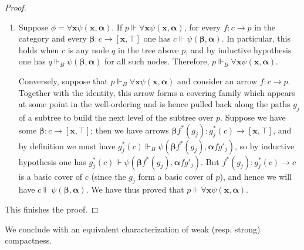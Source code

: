 \documentclass[a4paper,11pt]{article}
\theoremstyle{plain}
\theoremstyle{plain}
\theoremstyle{remark}
\begin{document}
\begin{proof}
\begin{enumerate}
  \item Suppose $\phi=\forall \mathbf{x} \psi(\mathbf{x}, \boldsymbol{\alpha})$. If $p \Vdash \forall \mathbf{x} \psi(\mathbf{x}, \boldsymbol{\alpha})$, for every $f: c \to p$ in the category and every $\boldsymbol{\beta}: c \to [\mathbf{x}, \top]$ one has $c \Vdash \psi(\boldsymbol{\beta}, \boldsymbol{\alpha})$. In particular, this holds when $c$ is any node $q$ in the tree above $p$, and by inductive hypothesis one has $q \Vdash_B \psi(\boldsymbol{\beta}, \boldsymbol{\alpha})$ for all such nodes. Therefore, $p \Vdash_B \forall \mathbf{x} \psi(\mathbf{x}, \boldsymbol{\alpha})$.
  
  Conversely, suppose that $p \Vdash_B \forall \mathbf{x} \psi(\mathbf{x}, \boldsymbol{\alpha})$ and consider an arrow $f: c \to p$. Together with the identity, this arrow forms a covering family which appears at some point in the well-ordering and is hence pulled back along the paths $g_j$ of a subtree to build the next level of the subtree over $p$. Suppose we have some $\boldsymbol{\beta}: c \to [\mathbf{x}, \top]$; then we have arrows $\boldsymbol{\beta} f^*(g_j): g_j^*(c) \to [\mathbf{x}, \top]$, and by definition we must have $g_j^*(c) \Vdash_B \psi(\boldsymbol{\beta} f^*(g_j), \boldsymbol{\alpha} fg'_j)$, so by inductive hypothesis one has $g_j^*(c) \Vdash \psi(\boldsymbol{\beta} f^*(g_j), \boldsymbol{\alpha} fg'_j)$. But $f^*(g_j): g_j^*(c) \to c$ is a basic cover of $c$ (since the $g_j$ form a basic cover of $p$), and hence we will have $c \Vdash \psi(\boldsymbol{\beta}, \boldsymbol{\alpha})$. We have thus proved that $p \Vdash \forall \mathbf{x} \psi(\mathbf{x}, \boldsymbol{\alpha})$.
 \end{enumerate}

This finishes the proof.
\end{proof}

We conclude with an equivalent characterization of weak (resp. strong) compactness.
\end{document}
